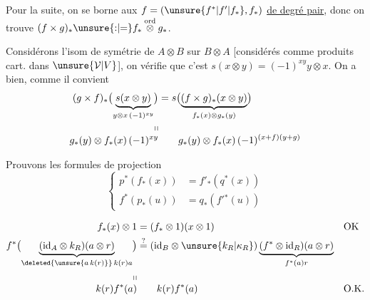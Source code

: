 Pour la suite, on se borne aux $f=(\unsure{f^*|f'|f_*},f_*)$ \uline{de degré pair}, donc on trouve $(f\times g)_*\unsure{{:}|{=}}f_*\overset{\mathrm{ord}}{\otimes}g_*$.

Considérons l'isom de symétrie de $A\otimes B$ sur $B\otimes A$ [considérés comme produits cart. dans $\unsure{\mathcal V|V}$], on vérifie que c'est $s(x\otimes y)=(-1)^{xy}y\otimes x$. On a bien, comme il convient
\[
\begin{aligned}
(g\times f)_*\bigl(\underbrace{s(x\otimes y)}_{y\otimes x\,(-1)^{xy}}\bigr)
 &=s\bigl(\underbrace{(f\times g)_*(x\otimes y)}_{f_*(x)\otimes g_*(y)}\bigr)\\[-2pt]
\shortparallel &\\[-4pt]
g_*(y)\otimes f_*(x)\,(-1)^{xy}
 &\qquad g_*(y)\otimes f_*(x)\,(-1)^{(x+f)(y+g)}
\end{aligned}
\]

Prouvons les formules de projection
\[
\left\{\begin{aligned}
p^*(f_*(x))&=f'_*(q^*(x))\\
f^*(p_*(u))&=q_*(f'{}^*(u))
\end{aligned}\right.
\]

\[
\begin{aligned}
 f_*(x)\otimes1&=(f_*\otimes1)(x\otimes1) &&\text{OK}\\
 f^*\bigl(\underbrace{(\mathrm{id}_A\otimes k_R)(a\otimes r)}_{\deleted{\unsure{a\,k(r)}}\,k(r)a}\bigr)
 &\overset{?}{=}(\mathrm{id}_B\otimes\unsure{k_R|\kappa_R})\underbrace{(f^*\otimes\mathrm{id}_R)(a\otimes r)}_{f^*(a)r}\\
 \shortparallel &\\[-3pt]
 k(r)f^*(a)&\qquad k(r)f^*(a)&&\text{O.K.}
\end{aligned}
\]

